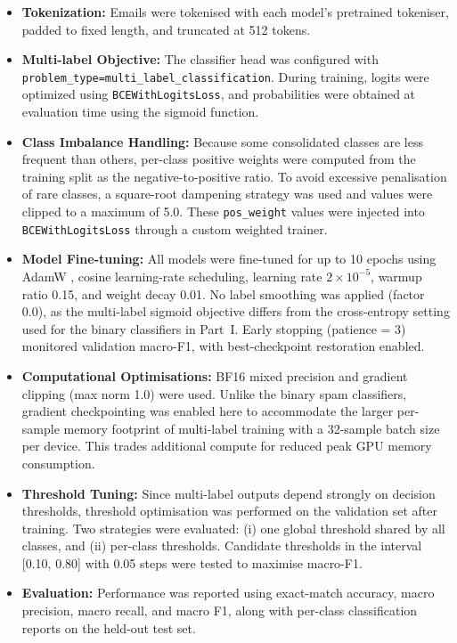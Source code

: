 \begin{itemize}
	\item \textbf{Tokenization:} Emails were tokenised with each model's pretrained tokeniser, padded to fixed length, and truncated at 512 tokens.

	\item \textbf{Multi-label Objective:} The classifier head was configured with \texttt{problem\_type=multi\_label\_classification}. During training, logits were optimized using \texttt{BCEWithLogitsLoss}, and probabilities were obtained at evaluation time using the sigmoid function.

	\item \textbf{Class Imbalance Handling:} Because some consolidated classes are less frequent than others, per-class positive weights were computed from the training split as the negative-to-positive ratio. To avoid excessive penalisation of rare classes, a square-root dampening strategy was used and values were clipped to a maximum of 5.0. These \texttt{pos\_weight} values were injected into \texttt{BCEWithLogitsLoss} through a custom weighted trainer.

	\item \textbf{Model Fine-tuning:} All models were fine-tuned for up to 10 epochs using \acs{AdamW} \cite{loshchilov2019decoupled}, cosine learning-rate scheduling, learning rate $2 \times 10^{-5}$, warmup ratio 0.15, and weight decay 0.01. No label smoothing was applied (factor 0.0), as the multi-label sigmoid objective differs from the cross-entropy setting used for the binary classifiers in Part~I. Early stopping (patience = 3) monitored validation macro-F1, with best-checkpoint restoration enabled.

	\item \textbf{Computational Optimisations:} \ac{BF16} mixed precision \cite{micikevicius2018mixed} and gradient clipping (max norm 1.0) were used. Unlike the binary spam classifiers, gradient checkpointing was enabled here to accommodate the larger per-sample memory footprint of multi-label training with a 32-sample batch size per device. This trades additional compute for reduced peak \ac{GPU} memory consumption.

	\item \textbf{Threshold Tuning:} Since multi-label outputs depend strongly on decision thresholds, threshold optimisation was performed on the validation set after training. Two strategies were evaluated: (i) one global threshold shared by all classes, and (ii) per-class thresholds. Candidate thresholds in the interval [0.10, 0.80] with 0.05 steps were tested to maximise macro-F1.

	\item \textbf{Evaluation:} Performance was reported using exact-match accuracy, macro precision, macro recall, and macro F1, along with per-class classification reports on the held-out test set.
\end{itemize}

